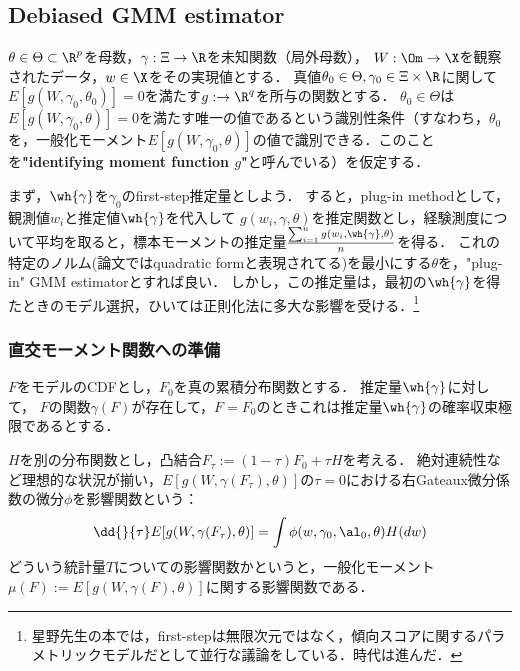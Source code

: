 \documentclass[uplatex,dvipdfmx]{jsreport}
\begin{document}
\subsection{Debiased GMM estimator}

\begin{notation}
    $\theta\in\Theta\subset\R^p$を母数，$\gamma:\Xi\to\R$を未知関数（局外母数），
    $W:\Om\to\X$を観察されたデータ，$w\in\X$をその実現値とする．
    真値$\theta_0\in\Theta,\gamma_0\in\Xi\times\R$に関して$E[g(W,\gamma_0,\theta_0)]=0$を満たす$g:\to\R^q$を所与の関数とする．
    $\theta_0\in\Theta$は$E[g(W,\gamma_0,\theta)]=0$を満たす唯一の値であるという識別性条件（すなわち，$\theta_0$を，一般化モーメント$E[g(W,\gamma_0,\theta)]$の値で識別できる．このことを\textbf{"identifying moment function $g$"}と呼んでいる）を仮定する．
\end{notation}

\begin{discussion}
    まず，$\wh{\gamma}$を$\gamma_0$のfirst-step推定量としよう．
    すると，plug-in methodとして，観測値$w_i$と推定値$\wh{\gamma}$を代入して
    $g(w_i,\gamma,\theta)$を推定関数とし，経験測度について平均を取ると，標本モーメントの推定量$\frac{\sum_{i=1}^ng(w_i,\wh{\gamma},\theta)}{n}$を得る．
    これの特定のノルム(論文ではquadratic formと表現されてる)を最小にする$\theta$を，"plug-in" GMM estimatorとすれば良い．
    しかし，この推定量は，最初の$\wh{\gamma}$を得たときのモデル選択，ひいては正則化法に多大な影響を受ける．\footnote{星野先生の本では，first-stepは無限次元ではなく，傾向スコアに関するパラメトリックモデルだとして並行な議論をしている．時代は進んだ．}
\end{discussion}

\subsubsection{直交モーメント関数への準備}

$F$をモデルのCDFとし，$F_0$を真の累積分布関数とする．
推定量$\wh{\gamma}$に対して，
$F$の関数$\gamma(F)$が存在して，$F=F_0$のときこれは推定量$\wh{\gamma}$の確率収束極限であるとする．

$H$を別の分布関数とし，凸結合$F_\tau:=(1-\tau)F_0+\tau H$を考える．
絶対連続性など理想的な状況が揃い，$E[g(W,\gamma(F_\tau),\theta)]$の$\tau=0$における右Gateaux微分係数の微分$\phi$を影響関数という：
\[\dd{}{\tau}E[g(W,\gamma(F_\tau),\theta)]=\int\phi(w,\gamma_0,\al_0,\theta)H(dw)\]
どういう統計量$T$についての影響関数かというと，一般化モーメント$\mu(F):=E[g(W,\gamma(F),\theta)]$に関する影響関数である．
\end{document}
